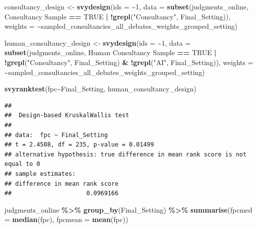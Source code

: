 \documentclass[
]{article}
\newenvironment{Shaded}{\begin{snugshade}}{\end{snugshade}}
\newcommand{\AttributeTok}[1]{\textcolor[rgb]{0.13,0.29,0.53}{#1}}
\newcommand{\ConstantTok}[1]{\textcolor[rgb]{0.56,0.35,0.01}{#1}}
\newcommand{\DecValTok}[1]{\textcolor[rgb]{0.00,0.00,0.81}{#1}}
\newcommand{\FunctionTok}[1]{\textcolor[rgb]{0.13,0.29,0.53}{\textbf{#1}}}
\newcommand{\NormalTok}[1]{#1}
\newcommand{\OtherTok}[1]{\textcolor[rgb]{0.56,0.35,0.01}{#1}}
\newcommand{\SpecialCharTok}[1]{\textcolor[rgb]{0.81,0.36,0.00}{\textbf{#1}}}
\newcommand{\StringTok}[1]{\textcolor[rgb]{0.31,0.60,0.02}{#1}}
\begin{document}
\begin{Shaded}
\begin{Highlighting}[]
\NormalTok{consultancy\_design }\OtherTok{\textless{}{-}} \FunctionTok{svydesign}\NormalTok{(}\AttributeTok{ids =} \SpecialCharTok{\textasciitilde{}}\DecValTok{1}\NormalTok{, }\AttributeTok{data =} \FunctionTok{subset}\NormalTok{(judgments\_online, }\StringTok{\textasciigrave{}}\AttributeTok{Consultancy Sample}\StringTok{\textasciigrave{}} \SpecialCharTok{==} \ConstantTok{TRUE} \SpecialCharTok{|} \SpecialCharTok{!}\FunctionTok{grepl}\NormalTok{(}\StringTok{"Consultancy"}\NormalTok{, Final\_Setting)), }\AttributeTok{weights =} \SpecialCharTok{\textasciitilde{}}\NormalTok{sampled\_consultancies\_all\_debates\_weights\_grouped\_setting)}



\NormalTok{human\_consultancy\_design }\OtherTok{\textless{}{-}} \FunctionTok{svydesign}\NormalTok{(}\AttributeTok{ids =} \SpecialCharTok{\textasciitilde{}}\DecValTok{1}\NormalTok{, }\AttributeTok{data =} \FunctionTok{subset}\NormalTok{(judgments\_online, }\StringTok{\textasciigrave{}}\AttributeTok{Human Consultancy Sample}\StringTok{\textasciigrave{}} \SpecialCharTok{==} \ConstantTok{TRUE} \SpecialCharTok{|} \SpecialCharTok{!}\FunctionTok{grepl}\NormalTok{(}\StringTok{"Consultancy"}\NormalTok{, Final\_Setting) }\SpecialCharTok{\&} \SpecialCharTok{!}\FunctionTok{grepl}\NormalTok{(}\StringTok{"AI"}\NormalTok{, Final\_Setting)), }\AttributeTok{weights =} \SpecialCharTok{\textasciitilde{}}\NormalTok{sampled\_consultancies\_all\_debates\_weights\_grouped\_setting)}


\FunctionTok{svyranktest}\NormalTok{(fpc}\SpecialCharTok{\textasciitilde{}}\NormalTok{Final\_Setting, human\_consultancy\_design)}
\end{Highlighting}
\end{Shaded}

\begin{verbatim}
## 
##  Design-based KruskalWallis test
## 
## data:  fpc ~ Final_Setting
## t = 2.4508, df = 235, p-value = 0.01499
## alternative hypothesis: true difference in mean rank score is not equal to 0
## sample estimates:
## difference in mean rank score 
##                     0.0969166
\end{verbatim}

\begin{Shaded}
\begin{Highlighting}[]
\NormalTok{judgments\_online }\SpecialCharTok{\%\textgreater{}\%} \FunctionTok{group\_by}\NormalTok{(Final\_Setting) }\SpecialCharTok{\%\textgreater{}\%} \FunctionTok{summarise}\NormalTok{(}\AttributeTok{fpcmed =} \FunctionTok{median}\NormalTok{(fpc),}
                                                           \AttributeTok{fpcmean =} \FunctionTok{mean}\NormalTok{(fpc))}
\end{Highlighting}
\end{Shaded}
\end{document}
